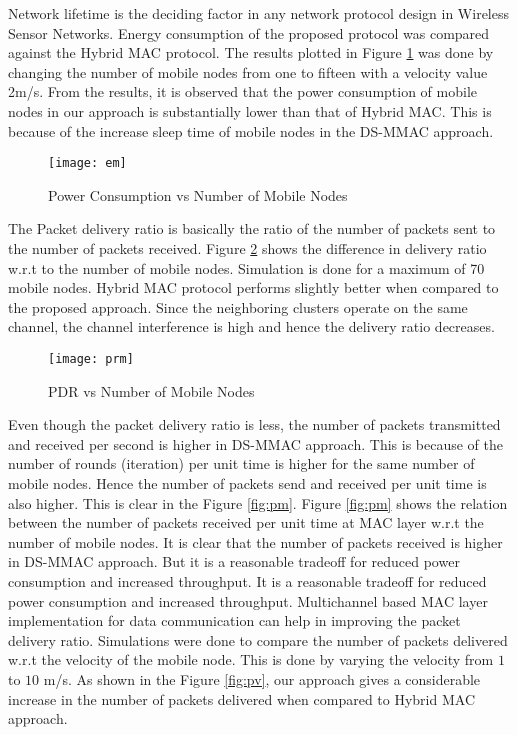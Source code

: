 Network lifetime is the deciding factor in any network protocol design in Wireless Sensor Networks. Energy consumption of the proposed protocol was compared against the Hybrid MAC protocol. The results plotted in Figure \ref{fig:em} was done by changing the number of mobile nodes from one to fifteen with a velocity value 2m/s. From the results, it is observed that the power consumption of mobile nodes in our approach is substantially lower than that of Hybrid MAC. This is because of the increase sleep time of mobile nodes in the DS-MMAC approach.\\
\begin{figure}[h]{} 
  \begin{center}
		\texttt{[image: em]}
  \end{center}
	\caption{Power Consumption vs Number of Mobile Nodes}
		\label{fig:em}
\end{figure}

The Packet delivery ratio is basically the ratio of the number of packets sent to the number of packets received. Figure \ref{fig:PDR} shows the difference in delivery ratio w.r.t to the number of mobile nodes.  Simulation is done for a maximum of 70 mobile nodes.  Hybrid MAC protocol performs slightly better when compared to the proposed approach. Since the neighboring clusters operate on the same channel, the channel interference is high and hence the delivery ratio decreases.
\begin{figure}[h]{} 
  \begin{center}
    		\texttt{[image: prm]}
  \end{center}
	\caption{PDR vs Number of Mobile Nodes}
	\label{fig:PDR}
\end{figure}

 Even though the packet delivery ratio is less, the number of packets transmitted and received per second is higher in DS-MMAC approach. This is because of the number of rounds (iteration) per unit time is higher for the same number of mobile nodes. Hence the number of packets send and received per unit time is also higher. This is clear in the Figure \ref{fig:pm}. Figure \ref{fig:pm} shows the relation between the number of packets received per unit time at MAC layer w.r.t the number of mobile nodes. It is clear that the number of packets received is higher in DS-MMAC approach.  But it is a reasonable tradeoff for reduced power consumption and increased throughput. It is a reasonable tradeoff for reduced power consumption and increased throughput. Multichannel based MAC layer implementation for data communication can help in improving the packet delivery ratio.  
 Simulations were done to compare the number of packets delivered w.r.t the velocity of the mobile node. This is done by varying the velocity from $1$ to $10$ m/s. As shown in the Figure \ref{fig:pv}, our approach gives a considerable increase in the number of packets delivered when compared to Hybrid MAC approach. \\

